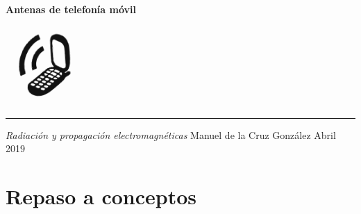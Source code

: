 \documentclass[a4paper,11pt,titlepage]{article}
\begin{document}
\begin{titlepage}
  \vspace*{4cm}
  {\fontsize{28}{34}\selectfont\bfseries Antenas de telefonía móvil}
  \par
  \vspace{0.5cm}
  \centering
  \includegraphics[height=3cm]{movilportada} \\
  \vspace{0.5cm}
  {\color{gris}\hrule}
  \Large{\itshape Radiación y propagación electromagnéticas}
  \vfill
  {\large Manuel de la Cruz González \hfill Abril 2019}
\end{titlepage}
\tableofcontents
\newpage
\section{Repaso a conceptos}
\end{document}
